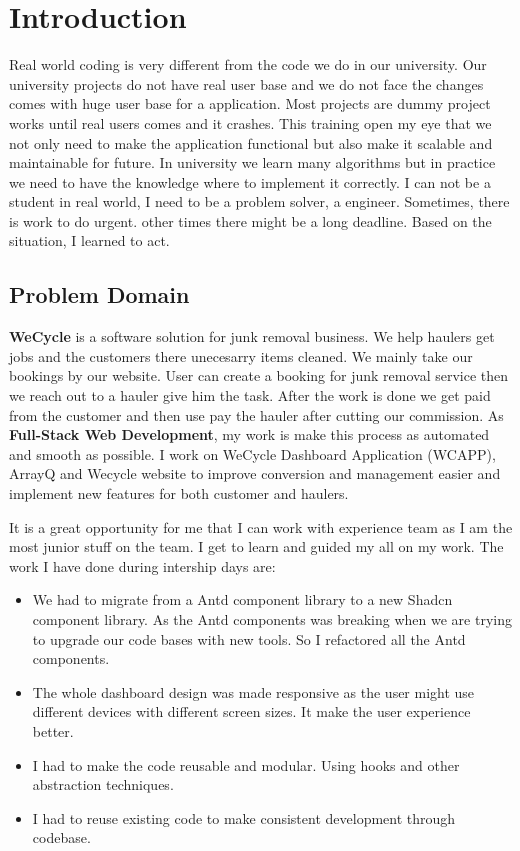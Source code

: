 \chapter{Introduction}

\par Real world coding is very different from the code we do in our university. Our university projects do not have real user base and we do not face the changes comes with huge user base for a application. Most projects are dummy project works until real users comes and it crashes. This training open my eye that we not only need to make the application functional but also make it scalable and maintainable for future. In university we learn many algorithms but in practice we need to have the knowledge where to implement it correctly. I can not be a student in real world, I need to be a problem solver, a engineer. Sometimes, there is work to do urgent. other times there might be a long deadline. Based on the situation, I learned to act.

\section{Problem Domain}

\par \textbf{WeCycle} is a software solution for junk removal business. We help haulers get jobs and the customers there unecesarry items cleaned. We mainly take our bookings by our website. User can create a booking for junk removal service then we reach out to a hauler give him the task. After the work is done we get paid from the customer and then use pay the hauler after cutting our commission. As \textbf{Full-Stack Web Development}, my work is make this process as automated and smooth as possible. I work on  WeCycle Dashboard Application (WCAPP), ArrayQ and Wecycle website to improve conversion and management easier and implement new features for both customer and haulers.

\par It is a great opportunity for me that I can work with experience team as I am the most junior stuff on the team. I get to learn and guided my all on my work. The work I have done during intership days are:
\begin{itemize}
    \item We had to migrate from a Antd component library to a new Shadcn component library. As the Antd components was breaking when we are trying to upgrade our code bases with new tools. So I refactored all the Antd components.
    \item The whole dashboard design was made responsive as the user might use different devices with different screen sizes. It make the user experience better.
    \item I had to make the code reusable and modular. Using hooks and other abstraction techniques.
    \item I had to reuse existing code to make consistent development through codebase.
\end{itemize}

